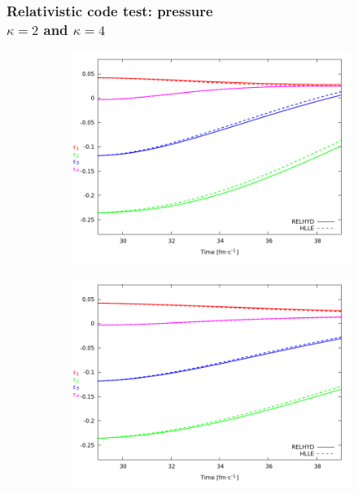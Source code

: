 \documentclass{beamer}
\begin{document}
\begin{frame}[noframenumbering]
\frametitle{Relativistic code test: pressure \\ $\kappa=2$ and $\kappa=4$}
\begin{center}
\begin{figure}[H]
	\centering
    \begin{subfigure}[b]{0.49\textwidth}
    		\includegraphics[width=\textwidth]{pic/res/hr_p_kappa=2}
	\end{subfigure}
	\begin{subfigure}[b]{0.49\textwidth}
        	\includegraphics[width=\textwidth]{pic/res/hr_p_kappa=4}
	\end{subfigure}
\end{figure}
\end{center}
\end{frame}
\end{document}
